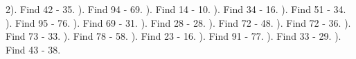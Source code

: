 \documentclass{article}%
\begin{document}
2). Find 42 {-} 35.%
\newline%
\newline%
). Find 94 {-} 69.%
\newline%
\newline%
). Find 14 {-} 10.%
\newline%
\newline%
). Find 34 {-} 16.%
\newline%
\newline%
). Find 51 {-} 34.%
\newline%
\newline%
). Find 95 {-} 76.%
\newline%
\newline%
). Find 69 {-} 31.%
\newline%
\newline%
). Find 28 {-} 28.%
\newline%
\newline%
). Find 72 {-} 48.%
\newline%
\newline%
). Find 72 {-} 36.%
\newline%
\newline%
). Find 73 {-} 33.%
\newline%
\newline%
). Find 78 {-} 58.%
\newline%
\newline%
). Find 23 {-} 16.%
\newline%
\newline%
). Find 91 {-} 77.%
\newline%
\newline%
). Find 33 {-} 29.%
\newline%
\newline%
). Find 43 {-} 38.%
\newline%
\end{document}
